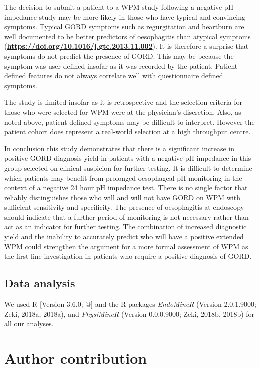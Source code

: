 \documentclass[english,man,floatsintext]{apa6}
\begin{document}
The decision to submit a patient to a WPM study following a negative pH impedance study may be more likely in those who have typical and convincing symptoms. Typical GORD symptoms such as regurgitation and heartburn are well documented to be better predictors of oesophagitis than atypical symptoms (\textbf{\url{https://doi.org/10.1016/j.gtc.2013.11.002}}). It is therefore a surprise that symptoms do not predict the presence of GORD. This may be because the symptom was user-defined insofar as it was recorded by the patient. Patient-defined features do not always correlate well with questionnaire defined symptoms.

The study is limited insofar as it is retrospective and the selection criteria for those who were selected for WPM were at the physician's discretion. Also, as noted above, patient defined symptoms may be difficult to interpret. However the patient cohort does represent a real-world selection at a high throughput centre.

In conclusion this study demonstrates that there is a significant increase in positive GORD diagnosis yield in patients with a negative pH impedance in this group selected on clinical suspicion for further testing. It is difficult to determine which patients may benefit from prolonged oesophageal pH monitoring in the context of a negative 24 hour pH impedance test. There is no single factor that reliably distinguishes those who will and will not have GORD on WPM with sufficient sensitivity and specificity. The presence of oesophagitis at endoscopy should indicate that a further period of monitoring is not necessary rather than act as an indicator for further testing. The combination of increased diagnostic yield and the inability to accurately predict who will have a positive extended WPM could strengthen the argument for a more formal assessment of WPM as the first line investigation in patients who require a positive diagnosis of GORD.

\hypertarget{data-analysis}{%
\subsection{Data analysis}\label{data-analysis}}

We used R {[}Version 3.6.0; @{]} and the R-packages \emph{EndoMineR} (Version 2.0.1.9000; Zeki, 2018a, 2018a), and \emph{PhysiMineR} (Version 0.0.0.9000; Zeki, 2018b, 2018b) for all our analyses.

\newpage

\hypertarget{author-contribution}{%
\section{Author contribution}\label{author-contribution}}
\end{document}
